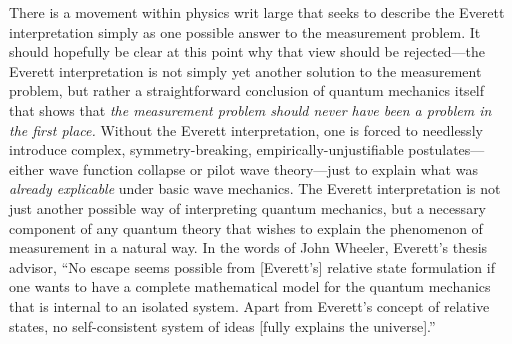 \documentclass[
    12pt,
    letterpaper,
    aps,
    prd,
    longbibliography,
    twocolumn,
    nofootinbib,
    raggedbottom,
    amsmath,
    amssymb,
    amsfonts,
]{revtex4-1}
\begin{document}
There is a movement within physics writ large that seeks to describe the Everett interpretation simply as one possible answer to the measurement problem. It should hopefully be clear at this point why that view should be rejected---the Everett interpretation is not simply yet another solution to the measurement problem, but rather a straightforward conclusion of quantum mechanics itself that shows that \textit{the measurement problem should never have been a problem in the first place.} Without the Everett interpretation, one is forced to needlessly introduce complex, symmetry-breaking, empirically-unjustifiable postulates---either wave function collapse or pilot wave theory---just to explain what was \textit{already explicable} under basic wave mechanics. The Everett interpretation is not just another possible way of interpreting quantum mechanics, but a necessary component of any quantum theory that wishes to explain the phenomenon of measurement in a natural way. In the words of John Wheeler, Everett's thesis advisor, ``No escape seems possible from [Everett's] relative state formulation if one wants to have a complete mathematical model for the quantum mechanics that is internal to an isolated system. Apart from Everett's concept of relative states, no self-consistent system of ideas [fully explains the universe].''\cite{wheeler}


\end{document}
